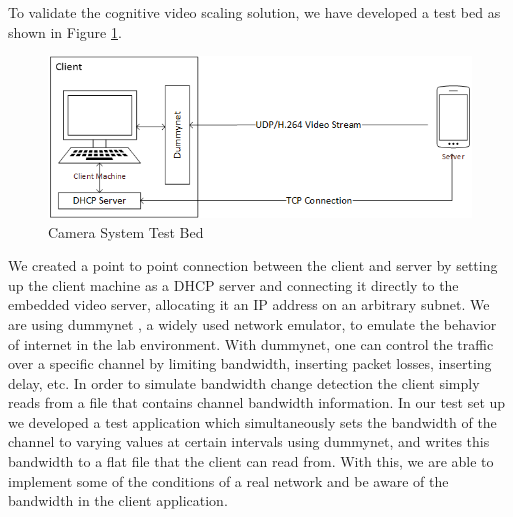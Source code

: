 \documentclass[3p,times,procedia]{elsarticle}
\begin{document}
To validate the cognitive video scaling solution, we have developed a test bed as shown in Figure \ref{fig:Testbed}.
\begin{figure}[H]
\centering
\includegraphics[width=0.7\linewidth]{CameraSystemTestbed.png}
\caption{Camera System Test Bed}
\label{fig:Testbed}
\end{figure}
We created a point to point connection between the client and server by setting up the client machine as a DHCP server and connecting it directly to the embedded video server, allocating it an IP address on an arbitrary subnet. We are using dummynet , a widely used network emulator, to emulate the behavior of internet in the lab environment. With dummynet, one can control the traffic over a specific channel by limiting bandwidth, inserting packet losses, inserting delay, etc. In order to simulate bandwidth change detection the client simply reads from a file that contains channel bandwidth information. In our test set up we developed a test application which simultaneously sets the bandwidth of the channel to varying values at certain intervals using dummynet, and writes this bandwidth to a flat file that the client can read from. With this, we are able to implement some of the conditions of a real network and be aware of the bandwidth in the client application. 
\end{document}
